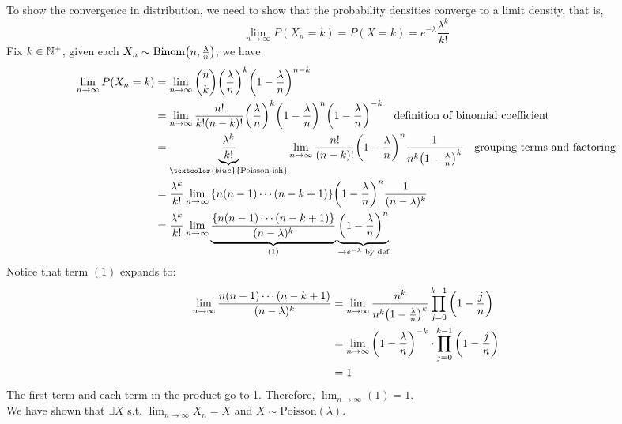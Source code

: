 \begin{prf}
\begin{prf*}
To show the convergence in distribution, we need to show that the probability densities converge to a limit density, that is, 
$$\lim_{n\to\infty} P(X_n=k) = P(X=k) = e^{-\lambda}\frac{\lambda^{k}}{k!}$$
Fix $k\in \mathbb{N}^+$, given each $X_n\sim\mathrm{Binom}\qty(n, \frac{\lambda}{n})$, we have
\begin{align*}
	\lim_{n\to\infty} P(X_n = k) &= \lim_{n\to\infty}\binom{n}{k} \qty(\frac{\lambda}{n})^{k}\qty(1-\frac{\lambda}{n})^{n-k}\\
	&= \lim_{n\to\infty}\frac{n!}{k!(n-k)!}\qty(\frac{\lambda}{n})^{k}\qty(1-\frac{\lambda}{n})^{n}\qty(1-\frac{\lambda}{n})^{-k} \quad \text{definition of binomial coefficient}\\
	&= \underbrace{\frac{\lambda^k}{k!}}_{\textcolor{blue}{\text{Poisson-ish}}}\lim_{n\to\infty}\frac{n!}{(n-k)!}\qty(1-\frac{\lambda}{n})^{n}\frac{1}{n^k\qty(1-\frac{\lambda}{n})^k} \quad \text{grouping terms and factoring}\\
	&= \frac{\lambda^k}{k!}\lim_{n\to\infty}\qty{n(n-1)\cdots(n-k+1)}\qty(1-\frac{\lambda}{n})^{n}\frac{1}{(n-\lambda)^k}\\
	&= \frac{\lambda^k}{k!}\lim_{n\to\infty}\underbrace{\frac{\qty{n(n-1)\cdots(n-k+1)}}{(n-\lambda)^k}}_{(1)}\underbrace{\qty(1-\frac{\lambda}{n})^{n}}_{\rightarrow e^{-\lambda} \text{ by def}}
\end{align*}
Notice that term $(1)$ expands to: 
\begin{align*}
	\lim_{n\to\infty} \frac{n(n-1)\cdots(n-k+1)}{(n-\lambda)^k} &= \lim_{n\to\infty} \frac{n^k}{n^k \qty(1 - \frac{\lambda}{n})^k} \prod_{j=0}^{k-1} \qty(1 - \frac{j}{n})\\
	&= \lim_{n\to\infty} \qty(1-\frac{\lambda}{n})^{-k}\cdot \prod_{j=0}^{k-1} \qty(1 - \frac{j}{n})\\
	&= 1
\end{align*}
The first term and each term in the product go to 1. Therefore, $\lim_{n\to\infty}(1) = 1$.\\

\noindent We have shown that $\exists X$ s.t. $\lim_{n\to\infty} X_n = X$ and $X\sim \mathrm{Poisson}(\lambda)$. 
\end{prf*}



\end{prf}
